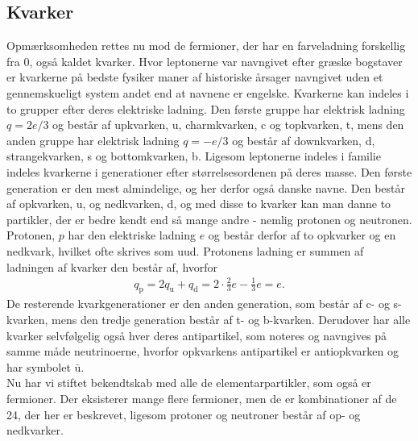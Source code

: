 \subsection{Kvarker}
Opmærksomheden rettes nu mod de fermioner, der har en farveladning forskellig fra 0, også kaldet kvarker. Hvor leptonerne var navngivet efter græske bogstaver er kvarkerne på bedste fysiker maner af historiske årsager navngivet uden et gennemskueligt system andet end at navnene er engelske. Kvarkerne kan indeles i to grupper efter deres elektriske ladning. Den første gruppe har elektrisk ladning $q=2e/3$ og består af upkvarken, u, charmkvarken, c og topkvarken, t, mens den anden gruppe har elektrisk ladning $q = -e/3$ og består af downkvarken, d, strangekvarken, s og bottomkvarken, b. Ligesom leptonerne indeles i familie indeles kvarkerne i generationer efter størrelsesordenen på deres masse. Den første generation er den mest almindelige, og her derfor også danske navne. Den består af opkvarken, u, og nedkvarken, d, og med disse to kvarker kan man danne to partikler, der er bedre kendt end så mange andre - nemlig protonen og neutronen. Protonen, $p$ har den elektriske ladning $e$ og består derfor af to opkvarker og en nedkvark, hvilket ofte skrives som uud. Protonens ladning er summen af ladningen af kvarker den består af, hvorfor
%
\begin{align}
    q_\mathrm{p} = 2q_\mathrm{u} + q_\mathrm{d} = 2\cdot\frac{2}{3}e - \frac{1}{3}e = e.
\end{align}
%
De resterende kvarkgenerationer er den anden generation, som består af c- og s-kvarken, mens den tredje generation består af t- og b-kvarken. Derudover har alle kvarker selvfølgelig også hver deres antipartikel, som noteres og navngives på samme måde neutrinoerne, hvorfor opkvarkens antipartikel er antiopkvarken og har symbolet $\bar{\mathrm u}$. \\

Nu har vi stiftet bekendtskab med alle de elementarpartikler, som også er fermioner. Der eksisterer mange flere fermioner, men de er kombinationer af de 24, der her er beskrevet, ligesom protoner og neutroner består af op- og nedkvarker.

